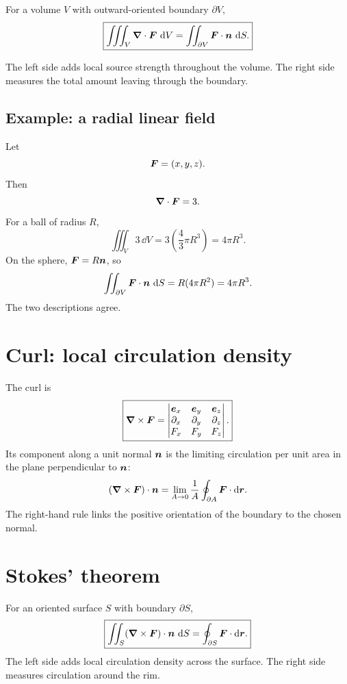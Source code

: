 \documentclass[11pt,a4paper]{article}
\begin{document}
For a volume $V$ with outward-oriented boundary $\partial V$,
\[
\boxed{
\iiint_V\boldsymbol\nabla\cdot\bm{F}\,\mathop{}\!\mathrm d V
=\iint_{\partial V}\bm{F}\cdot\bm{n}\,\mathop{}\!\mathrm d S.}
\]

The left side adds local source strength throughout the volume. The right side measures the total amount leaving through the boundary.

\subsection{Example: a radial linear field}

Let
\[
\bm{F}=(x,y,z).
\]
Then
\[
\boldsymbol\nabla\cdot\bm{F}=3.
\]
For a ball of radius $R$,
\[
\iiint_V3\,\dd V=3\left(\frac43\pi R^3\right)=4\pi R^3.
\]
On the sphere, $\bm{F}=R\bm{n}$, so
\[
\iint_{\partial V}\bm{F}\cdot\bm{n}\,\mathop{}\!\mathrm d S
=R(4\pi R^2)=4\pi R^3.
\]
The two descriptions agree.

\section{Curl: local circulation density}

The curl is
\[
\boxed{
\boldsymbol\nabla\times\bm{F}
=\begin{vmatrix}
\bm{e}_x&\bm{e}_y&\bm{e}_z\\
\partial_x&\partial_y&\partial_z\\
F_x&F_y&F_z
\end{vmatrix}.}
\]
Its component along a unit normal $\bm{n}$ is the limiting circulation per unit area in the plane perpendicular to $\bm{n}$:
\[
(\boldsymbol\nabla\times\bm{F})\cdot\bm{n}
=\lim_{A\to0}\frac{1}{A}\oint_{\partial A}\bm{F}\cdot\mathop{}\!\mathrm d\bm{r}.
\]
The right-hand rule links the positive orientation of the boundary to the chosen normal.

\section{Stokes' theorem}

For an oriented surface $S$ with boundary $\partial S$,
\[
\boxed{
\iint_S(\boldsymbol\nabla\times\bm{F})\cdot\bm{n}\,\mathop{}\!\mathrm d S
=\oint_{\partial S}\bm{F}\cdot\mathop{}\!\mathrm d\bm{r}.}
\]
The left side adds local circulation density across the surface. The right side measures circulation around the rim.

\begin{center}
\end{center}
\end{document}
